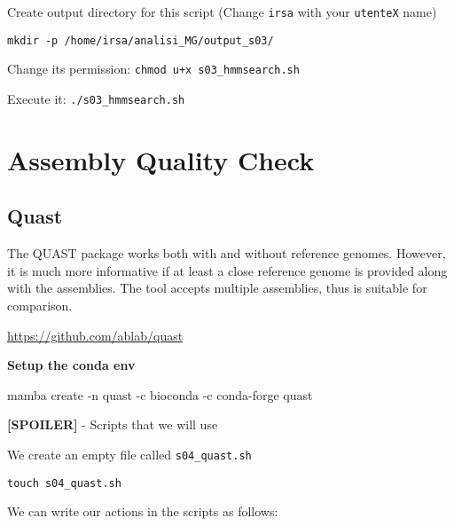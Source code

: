 \documentclass[
]{book}
\newenvironment{Shaded}{\begin{snugshade}}{\end{snugshade}}
\newcommand{\AttributeTok}[1]{\textcolor[rgb]{0.13,0.29,0.53}{#1}}
\newcommand{\CommentTok}[1]{\textcolor[rgb]{0.56,0.35,0.01}{\textit{#1}}}
\newcommand{\ExtensionTok}[1]{#1}
\newcommand{\NormalTok}[1]{#1}
\newcommand{\OperatorTok}[1]{\textcolor[rgb]{0.81,0.36,0.00}{\textbf{#1}}}
\newcommand{\StringTok}[1]{\textcolor[rgb]{0.31,0.60,0.02}{#1}}
\newcommand{\VariableTok}[1]{\textcolor[rgb]{0.00,0.00,0.00}{#1}}
\begin{document}
Create output directory for this script (Change \texttt{irsa} with your \texttt{utenteX} name)

\begin{verbatim}
mkdir -p /home/irsa/analisi_MG/output_s03/
\end{verbatim}

Change its permission:
\texttt{chmod\ u+x\ s03\_hmmsearch.sh}

Execute it:
\texttt{./s03\_hmmsearch.sh}

\section{Assembly Quality Check}\label{assembly-quality-check}

\subsection{Quast}\label{quast}

The QUAST package works both with and without reference genomes. However, it is much more informative if at least a close reference genome is provided along with the assemblies. The tool accepts multiple assemblies, thus is suitable for comparison.

\url{https://github.com/ablab/quast}

\textbf{Setup the conda env}

\begin{Shaded}
\begin{Highlighting}[]
\ExtensionTok{mamba}\NormalTok{ create }\AttributeTok{{-}n}\NormalTok{ quast }\AttributeTok{{-}c}\NormalTok{ bioconda }\AttributeTok{{-}c}\NormalTok{ conda{-}forge quast}
\end{Highlighting}
\end{Shaded}

\textbf{{[}SPOILER{]}} - Scripts that we will use

We create an empty file called \texttt{s04\_quast.sh}

\texttt{touch\ s04\_quast.sh}

We can write our actions in the scripts as follows:

\begin{Shaded}
\end{Shaded}
\end{document}
